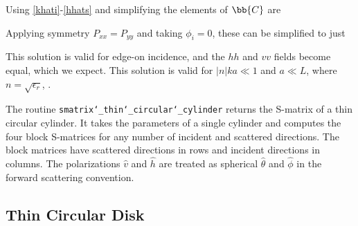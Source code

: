 
Using \eqref{khati}-\eqref{hhats} and simplifying the elements  of $\bb{C}$ are

Applying symmetry $P_{xx} = P_{yy}$ and taking $\phi_i = 0$, these can be simplified to just

This solution is valid for edge-on incidence, and the $hh$ and $vv$ fields become equal, which we expect.  This solution is valid for $\vert n \vert ka \ll 1$ and $a \ll L$, where $n = \sqrt{\epsilon_r}$, \cite{schiffer1979light}.

The routine \texttt{smatrix\char`_thin\char`_circular\char`_cylinder} returns the S-matrix of a thin circular cylinder. It takes the parameters of a single cylinder and computes the four block S-matrices for any number of incident and scattered directions. The block matrices have scattered directions in rows and incident directions in columns. The polarizations $\hat{v}$ and $\hat{h}$ are treated as spherical $\hat{\theta}$ and $\hat{\phi}$ in the forward scattering convention.

{\footnotesize
{}
}

\clearpage
\newpage

\subsection{Thin Circular Disk}

